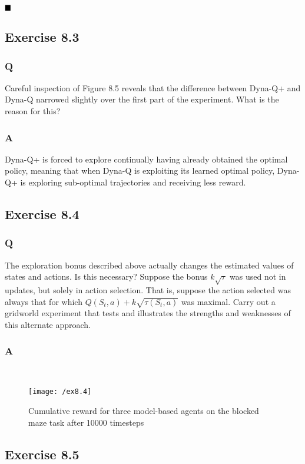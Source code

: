 $
\hfill \blacksquare
$

\subsection{Exercise 8.3}
\subsubsection{Q}
Careful inspection of Figure 8.5 reveals that the difference between Dyna-Q+ and Dyna-Q narrowed slightly over the first part of the experiment. What is the reason for this?
\subsubsection{A}
Dyna-Q+ is forced to explore continually having already obtained the optimal policy, meaning that when Dyna-Q is exploiting its learned optimal policy, Dyna-Q+ is exploring sub-optimal trajectories and receiving less reward.

\subsection{Exercise 8.4}
\subsubsection{Q}
The exploration bonus described above actually changes the estimated values of states and actions. Is this necessary? Suppose the bonus $k\sqrt{\tau}$ was used not in updates, but solely in action selection. That is, suppose the action selected was always that for which $Q(S_t, a) + k\sqrt{\tau(S_t, a)}$ was maximal. Carry out a gridworld experiment that tests and illustrates the strengths and weaknesses of this alternate approach.
\subsubsection{A}
\ProgrammingExercise \\
\begin{figure}[h!]
	\centering
	\texttt{[image: /ex8.4]}
	\caption{Cumulative reward for three model-based agents on the blocked maze task after 10000 timesteps}
	\label{fig: 8.4}
\end{figure}

\subsection{Exercise 8.5}
